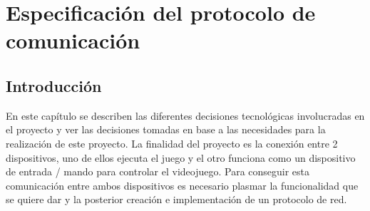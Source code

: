 %
%
%
%
%
%
%
%
%
%


\begin{FraseCelebre}
\begin{Frase}
\end{Frase}
\begin{Fuente}
\end{Fuente}
\end{FraseCelebre}


\chapter{Especificaci\'on del protocolo de comunicaci\'on}
\label{cap3}
\label{cap:especificacion}

\section{Introducci\'on}
\label{cap3:sec:intro}
En este cap\'itulo se describen las diferentes decisiones tecnol\'ogicas involucradas en el proyecto y ver las decisiones tomadas en base a las necesidades para la realizaci\'on de este proyecto. La finalidad del proyecto es la conexi\'on entre 2 dispositivos, uno de ellos ejecuta el juego y el otro funciona como un dispositivo de entrada / mando para controlar el videojuego. 
Para conseguir esta comunicaci\'on entre ambos dispositivos es necesario plasmar la funcionalidad que se quiere dar y la posterior creaci\'on e implementaci\'on de un protocolo de red.


